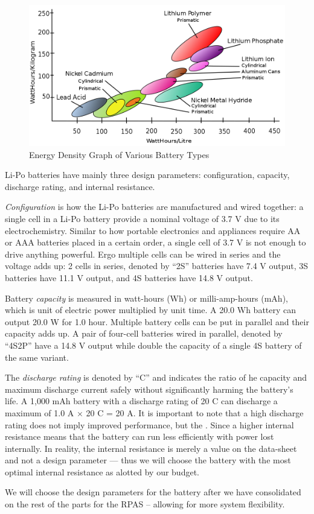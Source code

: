 \begin{figure}[h]
    \centering
    \includegraphics[scale=0.5]{img/energydensity.png}
    \caption{Energy Density Graph of Various Battery Types}
    \label{fig:batterytypes}
\end{figure}

Li-Po batteries have mainly three design parameters: configuration, capacity,  discharge rating, and internal resistance.

\textit{Configuration} is how the Li-Po batteries are manufactured and wired together: a single cell in a Li-Po battery provide a 
nominal voltage of 3.7 V due to its electrochemistry.
Similar to how portable electronics and appliances require AA or AAA batteries placed in a certain order, a single cell of 3.7 V is not enough to drive anything powerful. Ergo multiple cells can be wired in series and the 
voltage adds up: 2 cells in series, denoted by ``2S'' batteries have 7.4 V output, 3S batteries have 11.1 V output, and 4S batteries have 14.8 V output. 

Battery \textit{capacity} is measured in watt-hours (Wh) or milli-amp-hours (mAh), which is unit of electric power multiplied by unit time. A 20.0 Wh battery can output 20.0 W for 1.0 hour. Multiple battery cells can be put in parallel and their capacity adds up. A pair of four-cell batteries wired in parallel, denoted by ``4S2P'' have a 14.8 V output while double the capacity of a single 4S battery of the same variant.

The \textit{discharge rating} is denoted by ``C'' and indicates the ratio of he capacity and maximum discharge current safely without significantly harming the battery's life. A 1,000 
mAh battery with a discharge rating of 20 C can discharge a maximum of 1.0 A $\times$ 20 C = 20 A. It is important to note that a high discharge rating does not imply improved performance, but the . Since a higher internal resistance means that the battery can run less efficiently with power lost internally. In reality, the internal resistance is merely a value on the data-sheet and not a design parameter --- thus we will choose the battery with the most optimal internal resistance as alotted by our budget. 

We will choose the design parameters for the battery after we have consolidated on the rest of the parts for the RPAS -- allowing for more system flexibility.
